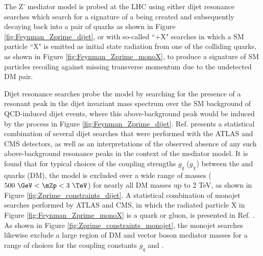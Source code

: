 The Z' mediator model is probed at the LHC using either dijet resonance searches \cite{Zprime_portal_gen} which search for a signature of a \Zprime being created and subsequently decaying back into a pair of quarks as shown in Figure \ref{fig:Feynman_Zprime_dijet}, or with so-called ``\met+X" searches \cite{Zprime_portal_monojet_dijet} in which a SM particle ``X" is emitted as initial state radiation from one of the colliding quarks, as shown in Figure \ref{fig:Feynman_Zprime_monoX}, to produce a signature of SM particles recoiling against missing transverse momentum due to the undetected DM pair. 

Dijet resonance searches probe the model by searching for the presence of a resonant peak in the dijet invariant mass spectrum over the SM background of QCD-induced dijet events, where this above-background peak would be induced by the process in Figure \ref{fig:Feynman_Zprime_dijet}. Ref. \cite{Zprime_portal_dijet} presents a statistical combination of several dijet searches that were performed with the ATLAS and CMS detectors, as well as an interpretations of the observed absence of any such above-background resonance peaks in the context of the \Zprime mediator model. It is found that for typical choices of the coupling strengths \(g_q\) (\(g_\chi\)) between the \Zprime and quarks (DM), the model is excluded over a wide range of \Zprime masses (\(500~\GeV < \mZp < 3~\TeV\)) for nearly all DM masses up to 2 TeV, as shown in Figure \ref{fig:Zprime_constraints_dijet}. A statistical combination of monojet searches performed by ATLAS and CMS, in which the radiated particle X in Figure \ref{fig:Feynman_Zprime_monoX} is a quark or gluon, is presented in Ref. \cite{Zprime_portal_monojet_dijet}. As shown in Figure \ref{fig:Zprime_constraints_monojet}, the monojet searches likewise exclude a large region of DM and vector boson mediator masses for a range of choices for the coupling constants \(g_q\) and \gchi.

